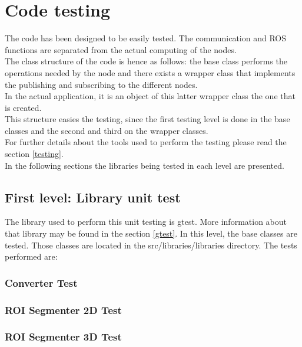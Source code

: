 \chapter{Code testing}
The code has been designed to be easily tested. The communication and ROS functions are separated from the actual computing of the nodes. 
\\

The class structure of the code is hence as follows: the base class performs the operations needed by the node and there exists a wrapper class that implements the publishing and subscribing to the different nodes. \\

In the actual application, it is an object of this latter wrapper class the one that is created. 
\\

This structure easies the testing, since the first testing level is done in the base classes and the second and third on the wrapper classes.
\\

For further details about the tools used to perform the testing please read the section \ref{testing}.
\\

In the following sections the libraries being tested in each level are presented. 

	\section{First level: Library unit test}
		The library used to perform this unit testing is gtest. More information about that library may be found in the section \ref{gtest}.
		In this level, the base classes are tested. Those classes are located in the src/libraries/libraries directory. The tests performed are: 
			\subsection{Converter Test}

			\subsection{ROI Segmenter 2D Test}

			\subsection{ROI Segmenter 3D Test}

